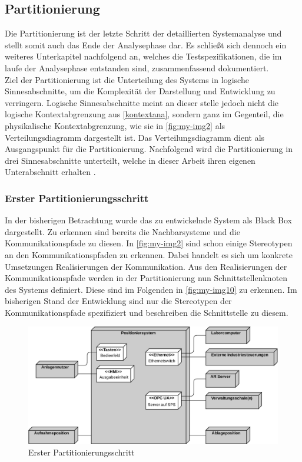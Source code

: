 \documentclass[../../../Bachelorarbeit.tex]{subfiles}
\begin{document}
\subsection{Partitionierung}
Die Partitionierung ist der letzte Schritt der detaillierten Systemanalyse und stellt somit auch das Ende der Analysephase dar. Es schließt sich dennoch ein weiteres Unterkapitel nachfolgend an, welches die Testspezifikationen, die im laufe der Analysephase entstanden sind, zusammenfassend dokumentiert. \\
Ziel der Partitionierung ist die Unterteilung des Systems in logische Sinnesabschnitte, um die Komplexität der Darstellung und Entwicklung zu verringern. Logische Sinnesabschnitte meint an dieser stelle jedoch nicht die logische Kontextabgrenzung aus \autoref{kontextana}, sondern ganz im Gegenteil, die physikalische Kontextabgrenzung, wie sie in \autoref{fig:my-img2} als Verteilungsdiagramm dargestellt ist. Das Verteilungsdiagramm dient als Ausgangspunkt für die Partitionierung. Nachfolgend wird die Partitionierung in drei Sinnesabschnitte unterteilt, welche in dieser Arbeit ihren eigenen Unterabschnitt erhalten \cite[274]{Tabeling2006}. \\

\subsubsection{Erster Partitionierungsschritt}
In der bisherigen Betrachtung wurde das zu entwickelnde System als Black Box dargestellt. Zu erkennen sind bereits die Nachbarsysteme und die Kommunikationspfade zu diesen. In \autoref{fig:my-img2} sind schon einige Stereotypen an den Kommunikationspfaden zu erkennen. Dabei handelt es sich um konkrete Umsetzungen \bzw Realisierungen der Kommunikation. Aus den Realisierungen der Kommunikationspfade werden in der Partitionierung nun Schnittstellenknoten des Systems definiert. Diese sind im Folgenden in \autoref{fig:my-img10} zu erkennen. Im bisherigen Stand der Entwicklung sind nur die Stereotypen der Kommunikationspfade spezifiziert und beschreiben die Schnittstelle zu diesem. 

\begin{figure}[H]
    \centering
    \includegraphics[width=\textwidth]{Images/erster_schritt.pdf}
    \caption[Erster Partitionierungsschritt]{Erster Partitionierungsschritt}
    \label{fig:my-img10}
\end{figure}
\end{document}
